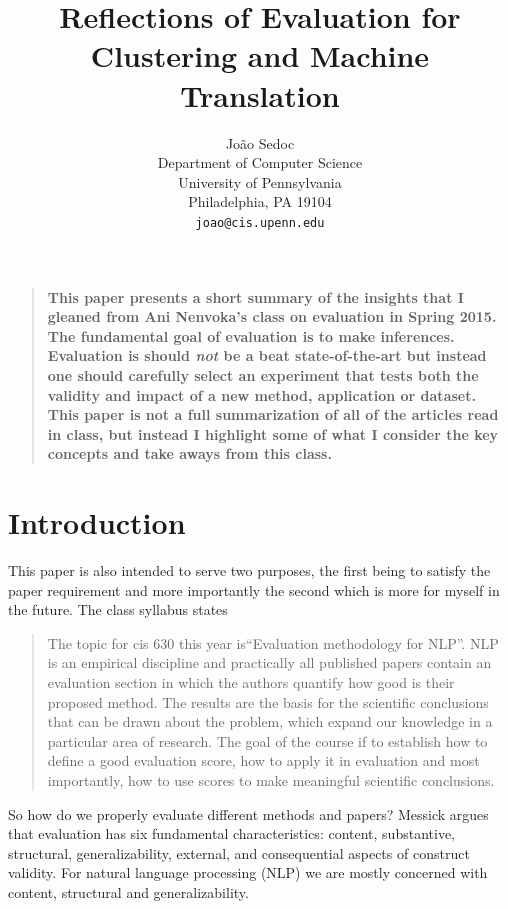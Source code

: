 \documentclass[11pt]{article}
\title{Reflections of Evaluation for Clustering and Machine Translation}
\author{
Jo\~{a}o Sedoc \\
Department of Computer Science\\
University of Pennsylvania\\
Philadelphia, PA 19104 \\
\texttt{joao@cis.upenn.edu}
}
\date
\newenvironment{sciabstract}{%
\begin{quote} \bf}
{\end{quote}}
\begin{document}
 


\baselineskip24pt


\maketitle 

\begin{sciabstract}
  This paper presents a short summary of the insights that I gleaned from Ani Nenvoka's class
  on evaluation in Spring 2015.
The fundamental goal of evaluation is to make inferences. Evaluation is should {\it not} be a beat state-of-the-art but instead one should carefully select an experiment that tests both the validity and impact of a new method, application or dataset.
  This paper is not a full summarization of all of the articles read in class, but instead I highlight some of what I consider the key concepts and take aways from this class.
\end{sciabstract}



\section*{Introduction}
  This paper is also intended to serve two purposes, the first being to satisfy the paper requirement and more importantly the second which is more for myself in the future.
  The class syllabus states
\begin{quote}
The topic for cis 630 this year is``Evaluation methodology for NLP''. NLP is an empirical discipline and practically all published papers contain an evaluation section in which the authors quantify how good is their proposed method. The results are the basis for the scientific conclusions that can be drawn about the problem, which expand our knowledge in a particular area of research. The goal of the course if to establish how to define a good evaluation score, how to apply it in evaluation and most importantly, how to use scores to make meaningful scientific conclusions. 
\end{quote}

So how do we properly evaluate different methods and papers? Messick \cite{messick1995validity} argues that evaluation has six fundamental characteristics: 
content, substantive, structural, generalizability, external,
and consequential aspects of construct validity. 
For natural language processing (NLP) we are mostly concerned with content, structural and generalizability. 
\end{document}

